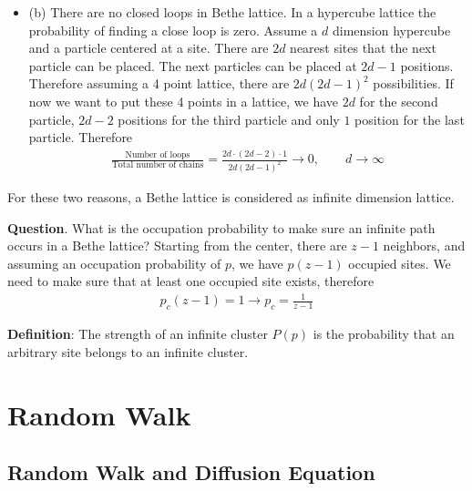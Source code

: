 \begin{itemize}
\item (b) There are no closed loops in Bethe lattice. In a hypercube
  lattice the probability of finding a close loop is zero. Assume a
  $d$ dimension hypercube and a particle centered at a site. There are
  $2d$ nearest sites that the next particle can be placed. The next
  particles can be placed at $2d-1$ positions. Therefore assuming a 4
  point lattice, there are $2d (2d-1)^2$ possibilities. If now we want
  to put these 4 points in a lattice, we have $2d$ for the second
  particle, $2d-2$ positions for the third particle and only $1$
  position for the last particle. Therefore
  \begin{align}
    \frac{\text{Number of loops}}{\text{Total number of chains}} = \frac{2d\cdot(2d-2)\cdot 1 }{2d (2d-1)^{2}}   \to 0, \qquad d\to \infty
  \end{align}
  
\end{itemize}

For these two reasons, a Bethe lattice is considered as infinite
dimension lattice.

\textbf{Question}. What is the occupation probability to make sure an
infinite path occurs in a Bethe lattice? Starting from the center,
there are $z-1$ neighbors, and assuming an occupation probability of
$p$, we have $p(z-1)$ occupied sites. We need to make sure that at
least one occupied site exists, therefore
%
\begin{align}
  p_c(z-1) = 1 \to p_c = \frac{1}{z-1} 
\end{align}
%


\textbf{Definition}: The strength of an infinite cluster $P(p)$ is the
probability that an arbitrary site belongs to an infinite cluster. 




\section{Random Walk}

\subsection{Random Walk and Diffusion Equation}


